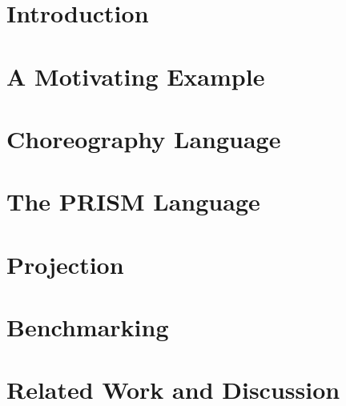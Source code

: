 \documentclass{lmcs} %
\theoremstyle{plain}\newtheorem{satz}[thm]{Satz} %
\begin{document}
\maketitle

\section{Introduction}\label{sec:intro}


\section{A Motivating Example}\label{sec:example}


\section{Choreography Language}\label{sec:chor}


\section{The PRISM Language}\label{sec:prism}


\section{Projection}\label{sec:proj}


%

\section{Benchmarking}\label{sec:bench}


\section{Related Work and Discussion}



%


\end{document}
